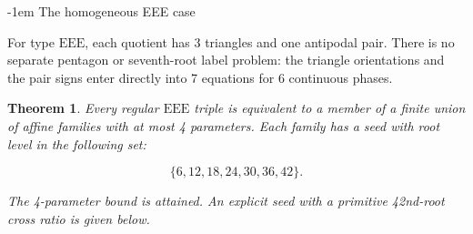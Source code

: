 \documentclass[11pt,a4paper]{article}
\makeatletter
\newtheorem{theorem}{Theorem}[section]
\theoremstyle{plain}
\theoremstyle{definition}
\theoremstyle{plain}
\renewcommand\subsection{\@startsection{subsection}{2}{\z@}  {\medskipamount}  {-1em}  {\normalfont\normalsize\bfseries}}
\makeatother
\begin{document}
\subsection{The homogeneous EEE case}\label{sec:EEE}

\medskip
For type $\mathrm{EEE}$, each quotient has 3 triangles and one antipodal pair. There is no separate pentagon or seventh-root label problem: the triangle orientations and the pair signs enter directly into 7 equations for 6 continuous phases.

\par\addvspace{\medskipamount}\noindent
\begin{minipage}{\linewidth}
\begin{theorem}\label{n11_EEE:main}
Every regular $\mathrm{EEE}$ triple is equivalent to a member of a finite union of affine families with at most 4 parameters. Each family has a seed with root level in the following set:

$$\{6,12,18,24,30,36,42\}.$$

The 4-parameter bound is attained. An explicit seed with a primitive 42nd-root cross ratio is given below.
\end{theorem}
\end{minipage}
\par\addvspace{\medskipamount}
\end{document}
